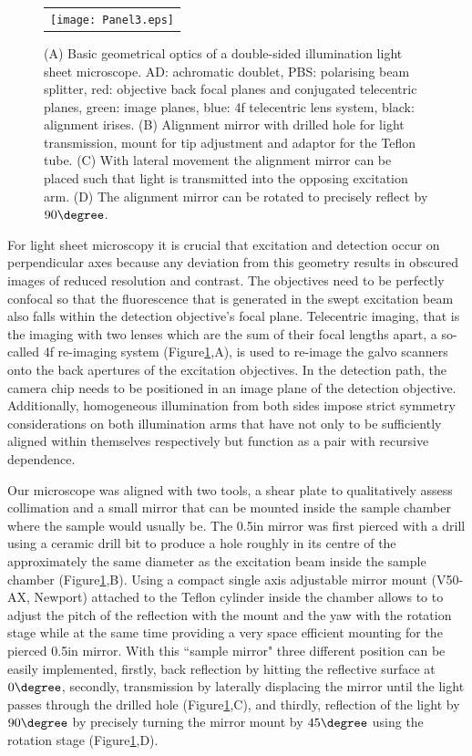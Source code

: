 \documentclass[12pt]{spieman}  %
\begin{document}
\begin{figure}
   \begin{center}
   \begin{tabular}{c}
   \texttt{[image: Panel3.eps]}
   \end{tabular}
   \end{center}
   \caption{\label{fig:alignment} (A) Basic geometrical optics of a double-sided illumination light sheet microscope. AD: achromatic doublet, PBS: polarising beam splitter, red: objective back focal planes and conjugated telecentric planes, green: image planes, blue: 4f telecentric lens system, black: alignment irises. (B) Alignment mirror with drilled hole for light transmission, mount for tip adjustment and adaptor for the Teflon tube. (C) With lateral movement the alignment mirror can be placed such that light is transmitted into the opposing excitation arm. (D) The alignment mirror can be rotated to precisely reflect by $90\degree$.} 
   \end{figure}

For light sheet microscopy it is crucial that excitation and detection occur on perpendicular axes because any deviation from this geometry results in obscured images of reduced resolution and contrast. The objectives need to be perfectly confocal so that the fluorescence that is generated in the swept excitation beam also falls within the detection objective's focal plane. Telecentric imaging, that is the imaging with two lenses which are the sum of their focal lengths apart, a so-called 4f re-imaging system (Figure\ref{fig:alignment},A), is used to re-image the galvo scanners onto the back apertures of the excitation objectives. In the detection path, the camera chip needs to be positioned in an image plane of the detection objective. Additionally, homogeneous illumination from both sides impose strict symmetry considerations on both illumination arms that have not only to be sufficiently aligned within themselves respectively but function as a pair with recursive dependence. 

Our microscope was aligned with two tools, a shear plate to qualitatively assess collimation and a small mirror that can be mounted inside the sample chamber where the sample would usually be. The 0.5in mirror was first pierced with a drill using a ceramic drill bit to produce a hole roughly in its centre of the approximately the same diameter as the excitation beam inside the sample chamber (Figure\ref{fig:alignment},B). Using a compact single axis adjustable mirror mount (V50-AX, Newport) attached to the Teflon cylinder inside the chamber allows to to adjust the pitch of the reflection with the mount and the yaw with the rotation stage while at the same time providing a very space efficient mounting for the pierced 0.5in mirror. With this ``sample mirror" three different position can be easily implemented, firstly, back reflection by hitting the reflective surface at $0\degree$, secondly, transmission by laterally displacing the mirror until the light passes through the drilled hole (Figure\ref{fig:alignment},C), and thirdly, reflection of the light by $90\degree$ by precisely turning the mirror mount by $45\degree$ using the rotation stage (Figure\ref{fig:alignment},D). 
\end{document}
